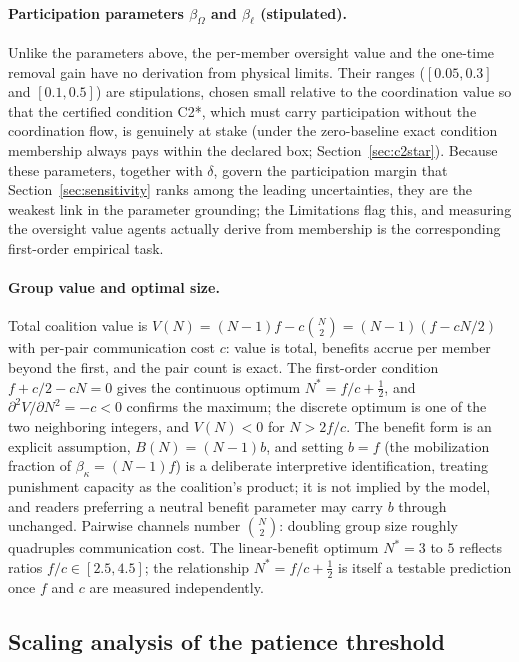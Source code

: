 \documentclass[manuscript,screen,review]{jair}
\begin{document}
\paragraph{Participation parameters $\beta_\Omega$ and $\beta_\ell$ (stipulated).}
Unlike the parameters above, the per-member oversight value and the one-time removal gain have no derivation from physical limits. Their ranges ($[0.05, 0.3]$ and $[0.1, 0.5]$) are stipulations, chosen small relative to the coordination value so that the certified condition C2*, which must carry participation without the coordination flow, is genuinely at stake (under the zero-baseline exact condition membership always pays within the declared box; Section~\ref{sec:c2star}). Because these parameters, together with $\delta$, govern the participation margin that Section~\ref{sec:sensitivity} ranks among the leading uncertainties, they are the weakest link in the parameter grounding; the Limitations flag this, and measuring the oversight value agents actually derive from membership is the corresponding first-order empirical task.

\paragraph{Group value and optimal size.}
Total coalition value is $V(N) = (N-1)f - c\binom{N}{2} = (N-1)(f - cN/2)$ with per-pair communication cost $c$: value is total, benefits accrue per member beyond the first, and the pair count is exact. The first-order condition $f + c/2 - cN = 0$ gives the continuous optimum $N^* = f/c + \tfrac{1}{2}$, and $\partial^2 V/\partial N^2 = -c < 0$ confirms the maximum; the discrete optimum is one of the two neighboring integers, and $V(N) < 0$ for $N > 2f/c$. The benefit form is an explicit assumption, $B(N) = (N-1)b$, and setting $b = f$ (the mobilization fraction of $\beta_\kappa = (N-1)f$) is a deliberate interpretive identification, treating punishment capacity as the coalition's product; it is not implied by the model, and readers preferring a neutral benefit parameter may carry $b$ through unchanged. Pairwise channels number $\binom{N}{2}$: doubling group size roughly quadruples communication cost. The linear-benefit optimum $N^* = 3$ to $5$ reflects ratios $f/c \in [2.5, 4.5]$; the relationship $N^* = f/c + \tfrac{1}{2}$ is itself a testable prediction once $f$ and $c$ are measured independently.

\subsection{Scaling analysis of the patience threshold}
\label{app:scaling}
\end{document}
